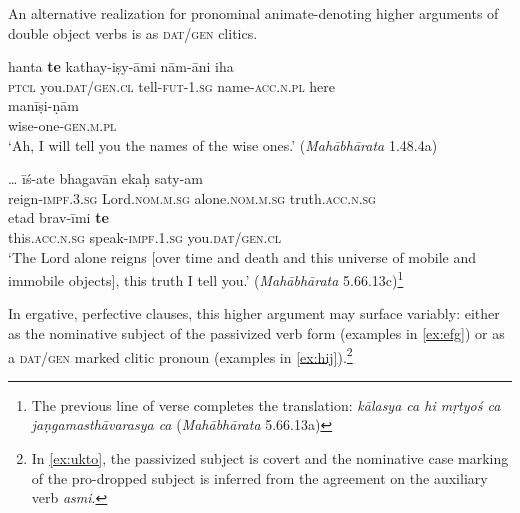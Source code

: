 \documentclass[output=paper,
modfonts
]{LSP/langsci}
\begin{document}
An alternative realization for pronominal  animate-denoting higher arguments of double object verbs is as \textsc{dat/gen} clitics. 

\begin{exe}
\ex\label{nonergdat}
\begin{xlist}
\ex\label{ex:hanta}\gll hanta \textbf{te} kathay-iṣy-āmi nām-āni iha \\
\textsc{ptcl}  you.\textsc{dat/gen.cl} tell-\textsc{fut-1.sg}  name-\textsc{acc.n.pl} here  \\

\gll manīṣi-ṇām \\ 
wise-one-\textsc{gen.m.pl} \\
\glt `Ah, I will tell you the names of the wise ones.' (\textit{Mahābhārata} 1.48.4a)

\ex\label{ex:isate}\gll \dots{} īś-ate bhagavān ekaḥ saty-am \\
{} reign-\textsc{impf.3.sg} Lord.\textsc{nom.m.sg} alone.\textsc{nom.m.sg} truth.\textsc{acc.n.sg} \\

\gll etad brav-īmi \textbf{te} \\
this.\textsc{acc.n.sg} speak-\textsc{impf.1.sg} you.\textsc{dat/gen.cl} \\
\glt `The Lord alone reigns [over time and death and this universe of mobile and immobile objects], this truth I tell you.' (\textit{Mahābhārata} 5.66.13c)\footnote{The previous line of verse completes the translation: \textit{kālasya ca hi mṛtyoś ca jaṇgamasthāvarasya ca}  (\textit{Mahābhārata} 5.66.13a)}
\end{xlist}
\end{exe} 



In ergative, perfective clauses, this higher argument may  surface variably: either as the nominative subject of the passivized verb form (examples in \cref{ex:efg})  or as a \textsc{dat/gen} marked clitic pronoun (examples in \cref{ex:hij}).\footnote{In \cref{ex:ukto}, the passivized subject is covert and the nominative case marking of the pro-dropped subject  is inferred from the agreement on  the auxiliary verb \textit{asmi}.}
  
\end{document}

